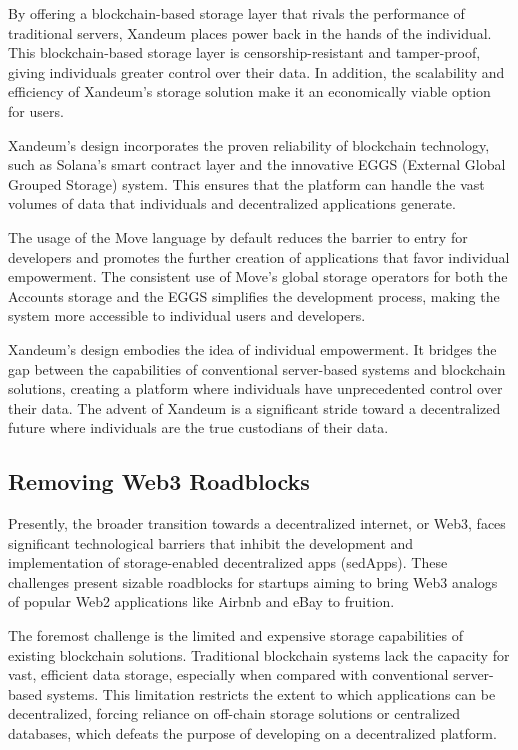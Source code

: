 \documentclass[11pt]{article}   	%
\begin{document}
By offering a blockchain-based storage layer that rivals the performance of traditional servers, Xandeum places power back in the hands of the individual. This blockchain-based storage layer is censorship-resistant and tamper-proof, giving individuals greater control over their data. In addition, the scalability and efficiency of Xandeum's storage solution make it an economically viable option for users.

Xandeum's design incorporates the proven reliability of blockchain technology, such as Solana's smart contract layer and the innovative EGGS (External Global Grouped Storage) system. This ensures that the platform can handle the vast volumes of data that individuals and decentralized applications generate.

The usage of the Move language by default reduces the barrier to entry for developers and promotes the further creation of applications that favor individual empowerment. The consistent use of Move's global storage operators for both the Accounts storage and the EGGS simplifies the development process, making the system more accessible to individual users and developers.

Xandeum's design embodies the idea of individual empowerment. It bridges the gap between the capabilities of conventional server-based systems and blockchain solutions, creating a platform where individuals have unprecedented control over their data. The advent of Xandeum is a significant stride toward a decentralized future where individuals are the true custodians of their data.

\subsection{Removing Web3 Roadblocks}
Presently, the broader transition towards a decentralized internet, or Web3, faces significant technological barriers that inhibit the development and implementation of storage-enabled decentralized apps (sedApps). These challenges present sizable roadblocks for startups aiming to bring Web3 analogs of popular Web2 applications like Airbnb and eBay to fruition.

The foremost challenge is the limited and expensive storage capabilities of existing blockchain solutions. Traditional blockchain systems lack the capacity for vast, efficient data storage, especially when compared with conventional server-based systems. This limitation restricts the extent to which applications can be decentralized, forcing reliance on off-chain storage solutions or centralized databases, which defeats the purpose of developing on a decentralized platform.
\end{document}
